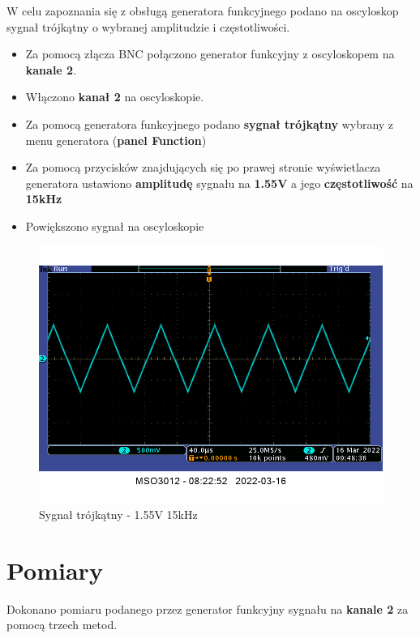 W celu zapoznania się z obsługą generatora funkcyjnego podano na oscyloskop sygnał trójkątny o wybranej amplitudzie i częstotliwości.


\begin{itemize}
    \item Za pomocą złącza BNC połączono generator funkcyjny z oscyloskopem na \textbf{kanale 2}.
    \item Włączono \textbf{kanał 2} na oscyloskopie.
    \item Za pomocą generatora funkcyjnego podano \textbf{sygnał trójkątny} wybrany z menu generatora (\textbf{panel Function})
    \item Za pomocą przycisków znajdujących się po prawej stronie wyświetlacza generatora ustawiono \textbf{amplitudę} sygnału na \textbf{1.55V} a jego \textbf{częstotliwość} na \textbf{15kHz}
    \item Powiększono sygnał na oscyloskopie
\end{itemize}

\begin{figure}[h]
    \centering
    \includegraphics[scale=0.5]{images/1_2.png}
    \caption{Sygnał trójkątny - 1.55V 15kHz}
    \label{fig:trojkat}
\end{figure}

\section{Pomiary}

Dokonano pomiaru podanego przez generator funkcyjny sygnału na \textbf{kanale 2} za pomocą trzech metod.

